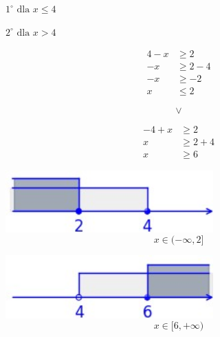 \documentclass[12pt, a4paper]{report}
\begin{document}
    \begin{minipage}{0.33\textwidth}
        \raggedleft
        {$1^\circ \text{ dla } x \leq 4$}
    \end{minipage}
    \hspace{0.23\textwidth}
    \begin{minipage}{0.31\textwidth}
        \raggedright
        {$2^\circ \text{ dla } x > 4$}
    \end{minipage}
    \begin{center}
    \begin{minipage}{0.2\textwidth}
        \begin{align*}
            4 - x &\geq 2 \\
            -x &\geq 2 - 4 \\
            -x &\geq -2 \\
            x &\leq 2
        \end{align*}
    \end{minipage}
    \hspace{0.05\textwidth}
    \begin{minipage}{0.04\textwidth}
        \[
        \vee
        \]
    \end{minipage}
    \hspace{0.05\textwidth}
    \begin{minipage}{0.2\textwidth}
        \begin{align*}
        -4 + x &\geq 2 \\
        x &\geq 2 + 4 \\
        x &\geq 6
        \end{align*}
    \end{minipage}
    \end{center}


    \begin{center}
        \begin{minipage}{0.3\textwidth}
            \centering
            \includegraphics[width=0.6\textwidth]{fig_2.jpg}
            \[x \in (-\infty, 2]\]
        \end{minipage}
        \hspace{0.01\textwidth}
        \begin{minipage}{0.01\textwidth}
        \end{minipage}
        \hspace{0.1\textwidth}
        \begin{minipage}{0.3\textwidth}
            \centering
            \includegraphics[width=0.6\textwidth]{fig_3.jpg}
            \[x \in [6, +\infty)\]
        \end{minipage}
    \end{center}
\end{document}
